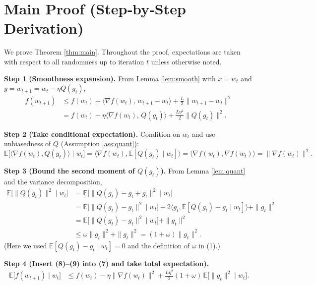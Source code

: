 \documentclass{article}
\newcommand{\E}{\mathbb{E}}
\begin{document}
\section*{Main Proof (Step‑by‑Step Derivation)}
We prove Theorem \ref{thm:main}.  Throughout the proof, expectations are taken
with respect to all randomness up to iteration $t$ unless otherwise noted.

\noindent\textbf{Step 1 (Smoothness expansion).}  
From Lemma \ref{lem:smooth} with $x=w_{t}$ and $y=w_{t+1}=w_{t}-\eta Q(g_{t})$,
\[
\begin{aligned}
f(w_{t+1})
&\le f(w_{t})+\langle\nabla f(w_{t}),\,w_{t+1}-w_{t}\rangle
   +\frac{L}{2}\|w_{t+1}-w_{t}\|^{2} \\
&= f(w_{t})-\eta\langle\nabla f(w_{t}),\,Q(g_{t})\rangle
   +\frac{L\eta^{2}}{2}\|Q(g_{t})\|^{2}. \tag{7}
\end{aligned}
\]

\noindent\textbf{Step 2 (Take conditional expectation).}  
Condition on $w_{t}$ and use unbiasedness of $Q$ (Assumption \ref{ass:quant}):
\[
\E\!\big[\langle\nabla f(w_{t}),Q(g_{t})\rangle\mid w_{t}\big]
   =\langle\nabla f(w_{t}),\E[Q(g_{t})\mid w_{t}]\rangle
   =\langle\nabla f(w_{t}),\nabla f(w_{t})\rangle
   =\|\nabla f(w_{t})\|^{2}. \tag{8}
\]

\noindent\textbf{Step 3 (Bound the second moment of $Q(g_{t})$).}  
From Lemma \ref{lem:quant} and the variance decomposition,
\[
\begin{aligned}
\E\!\big[\|Q(g_{t})\|^{2}\mid w_{t}\big]
&= \E\!\big[\|Q(g_{t})-g_{t}+g_{t}\|^{2}\mid w_{t}\big] \\
&= \E\!\big[\|Q(g_{t})-g_{t}\|^{2}\mid w_{t}\big]
   +2\langle g_{t},\E[Q(g_{t})-g_{t}\mid w_{t}]\rangle
   +\|g_{t}\|^{2} \\
&= \E\!\big[\|Q(g_{t})-g_{t}\|^{2}\mid w_{t}\big]+\|g_{t}\|^{2} \\
&\le \omega\|g_{t}\|^{2}+\|g_{t}\|^{2}
   =(1+\omega)\|g_{t}\|^{2}. \tag{9}
\end{aligned}
\]
(Here we used $\E[Q(g_{t})-g_{t}\mid w_{t}]=0$ and the definition of $\omega$
in (1).)

\noindent\textbf{Step 4 (Insert (8)–(9) into (7) and take total expectation).}
\[
\begin{aligned}
\E\!\big[f(w_{t+1})\mid w_{t}\big]
&\le f(w_{t})-\eta\|\nabla f(w_{t})\|^{2}
   +\frac{L\eta^{2}}{2}(1+\omega)\,\E\!\big[\|g_{t}\|^{2}\mid w_{t}\big]. \tag{10}
\end{aligned}
\]
\end{document}
